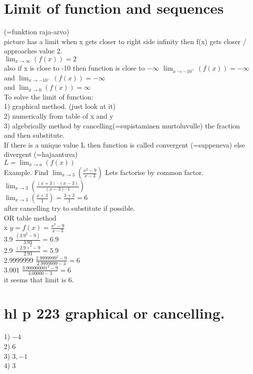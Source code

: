 \documentclass{article}
\begin{document}
  \section{Limit of function and sequences}
  (=funktion raja-arvo)\\
  picture has a limit when x gets closer to right side infinity then f(x) gets closer / approaches value 2.\\
  $\lim_{x\to\infty} (f(x))=2$\\
  also if x is close to -10 then function is close to $-\infty$ $\lim_{x\to-10^+}(f(x))=-\infty$\\
  and $\lim_{x\to-10^-}(f(x))=-\infty$\\
  and $\lim_{x\to0}(f(x))=\infty$\\
  To solve the limit of function:\\
  1) graphical method. (just look at it) \\
  2) numerically from table of x and y\\
  3) algebrically method by cancelling(=supistaminen murtoluvulle) the fraction and then substitute.\\
  If there is a unique value L then function is called convergent (=suppeneva) else divergent (=hajaantuva)\\
  $L=\lim_{x\to a}(f(x))$\\
  
  Example. Find $\lim_{x\to3}(\frac{x^2-9}{x-3})$
  Lets factorise by common factor. \\
  $\lim_{x\to3}(\frac{(x+3)\cdot(x-3)}{(x-3)\cdot1})$\\
  $\lim_{x\to3}(\frac{x+3}{1})=\frac{3+3}{1}=6$\\
  after cancelling try to substitute if possible.\\
  OR table method\\
  x      $y=f(x)=\frac{x^2-9}{x-3}$\\
  3.9    $\frac{(3.9^2-9)}{3.93}=6.9$\\
  2.9  $\frac{(2.9)^2-9}{2.93}=5.9$\\
  2.9999999 $\frac{2.9999999^2-9}{2.9999999-3}=6$\\
  3.001      $\frac{3.000000001^2-9}{3.00000-3}=6$\\
 it seems that limit is 6.\\
  \section{hl p 223 graphical or cancelling.}
  1) $-4$\\
  2) $6$\\
  3) $3, -1$\\
  4) $3$\\

  
  

   
\end{document}
